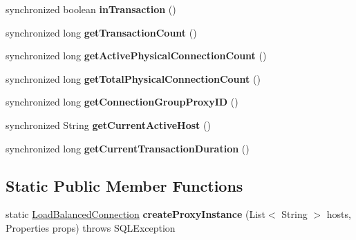 \begin{DoxyCompactItemize}
\item 
\mbox{\label{classcom_1_1mysql_1_1jdbc_1_1_load_balanced_connection_proxy_ad8ee3e7e11e79e6e5faa105abebe2d1a}} 
synchronized boolean {\bfseries in\+Transaction} ()
\item 
\mbox{\label{classcom_1_1mysql_1_1jdbc_1_1_load_balanced_connection_proxy_a7ef259cc8f0c70f1e7f34f9045855666}} 
synchronized long {\bfseries get\+Transaction\+Count} ()
\item 
\mbox{\label{classcom_1_1mysql_1_1jdbc_1_1_load_balanced_connection_proxy_a0f0d650cc6bb30201abd413d85dba24f}} 
synchronized long {\bfseries get\+Active\+Physical\+Connection\+Count} ()
\item 
\mbox{\label{classcom_1_1mysql_1_1jdbc_1_1_load_balanced_connection_proxy_ae4396b815097a256f19e016639c8a30c}} 
synchronized long {\bfseries get\+Total\+Physical\+Connection\+Count} ()
\item 
\mbox{\label{classcom_1_1mysql_1_1jdbc_1_1_load_balanced_connection_proxy_a26f9000126f359e00e2bd242bffa3cec}} 
synchronized long {\bfseries get\+Connection\+Group\+Proxy\+ID} ()
\item 
\mbox{\label{classcom_1_1mysql_1_1jdbc_1_1_load_balanced_connection_proxy_a4158e58182724fdc3e6ea62931fd65e8}} 
synchronized String {\bfseries get\+Current\+Active\+Host} ()
\item 
\mbox{\label{classcom_1_1mysql_1_1jdbc_1_1_load_balanced_connection_proxy_a37806e38ec657a257a3bd6d5acb303f4}} 
synchronized long {\bfseries get\+Current\+Transaction\+Duration} ()
\end{DoxyCompactItemize}
\subsection*{Static Public Member Functions}
\begin{DoxyCompactItemize}
\item 
\mbox{\label{classcom_1_1mysql_1_1jdbc_1_1_load_balanced_connection_proxy_af1567515ef4ab542daf30fe121af76bc}} 
static \mbox{\hyperlink{interfacecom_1_1mysql_1_1jdbc_1_1_load_balanced_connection}{Load\+Balanced\+Connection}} {\bfseries create\+Proxy\+Instance} (List$<$ String $>$ hosts, Properties props)  throws S\+Q\+L\+Exception 
\end{DoxyCompactItemize}
